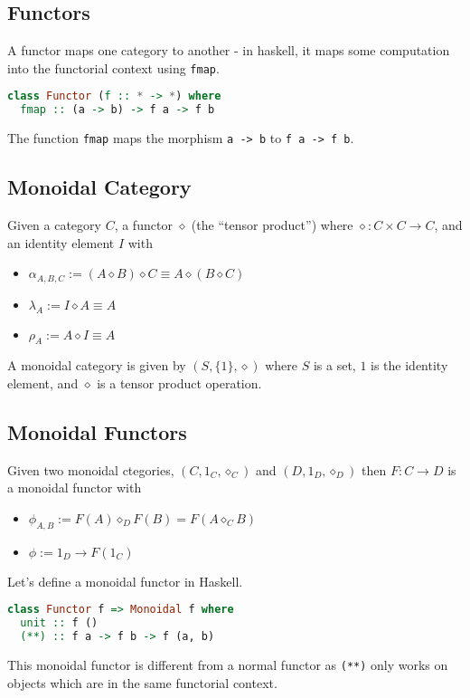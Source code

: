 \subsection{Functors}
A functor maps one category to another - in haskell, it maps some computation into the functorial context using \texttt{fmap}.

\begin{lstlisting}[language=haskell]
class Functor (f :: * -> *) where
  fmap :: (a -> b) -> f a -> f b
\end{lstlisting}

The function \texttt{fmap} maps the morphism \texttt{a -> b} to \texttt{f a -> f b}.

\subsection{Monoidal Category}
Given a category $C$, a functor $\diamond$ (the ``tensor product'') where $\diamond : C \times C \to C$, and an identity element $I$ with
\begin{itemize}
  \item $\alpha_{A,B,C} := (A \diamond B) \diamond C \equiv A \diamond (B \diamond C)$
  \item $\lambda_A := I \diamond A \equiv A$
  \item $\rho_A := A \diamond I \equiv A$
\end{itemize}
A monoidal category is given by $(S, \{1\}, \diamond)$ where $S$ is a set, $1$ is the identity element, and $\diamond$ is a tensor product operation.

\subsection{Monoidal Functors}
Given two monoidal ctegories, $(C, 1_C, \diamond_C)$ and $(D, 1_D, \diamond_D)$ then $F : C \to D$ is a monoidal functor with
\begin{itemize}
  \item $\phi_{A,B} := F(A) \diamond_D F(B) = F(A \diamond_C B)$
  \item $\phi := 1_D \to F(1_C)$
\end{itemize}

Let's define a monoidal functor in Haskell.
\begin{lstlisting}[language=haskell]
class Functor f => Monoidal f where
  unit :: f ()
  (**) :: f a -> f b -> f (a, b)
\end{lstlisting}

This monoidal functor is different from a normal functor as \texttt{(**)} only works on objects which are in the same functorial context.

